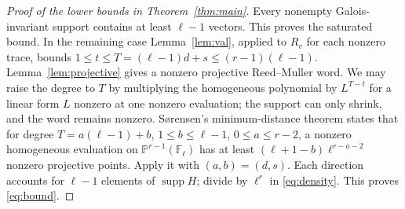 \documentclass[11pt]{article}
\theoremstyle{remark}\newtheorem{remark}[theorem]{Remark}
\newcommand{\F}{\mathbb F}
\newcommand{\supp}{\operatorname{supp}}
\begin{document}
\begin{proof}[Proof of the lower bounds in Theorem~\ref{thm:main}]
Every nonempty Galois-invariant support contains at least $\ell-1$ vectors. This proves the saturated bound. In the remaining case Lemma~\ref{lem:val}, applied to $R_v$ for each nonzero trace, bounds $1\le t\le T=(\ell-1)d+s\le(r-1)(\ell-1)$. Lemma~\ref{lem:projective} gives a nonzero projective Reed--Muller word. We may raise the degree to $T$ by multiplying the homogeneous polynomial by $L^{T-t}$ for a linear form $L$ nonzero at one nonzero evaluation; the support can only shrink, and the word remains nonzero. S\o rensen's minimum-distance theorem \cite{Sorensen,Ghorpade} states that for degree $T=a(\ell-1)+b$, $1\le b\le\ell-1$, $0\le a\le r-2$, a nonzero homogeneous evaluation on $\mathbb P^{r-1}(\F_\ell)$ has at least $(\ell+1-b)\ell^{r-a-2}$ nonzero projective points. Apply it with $(a,b)=(d,s)$. Each direction accounts for $\ell-1$ elements of $\supp H$; divide by $\ell^r$ in \eqref{eq:density}. This proves \eqref{eq:bound}.
\end{proof}
\end{document}
